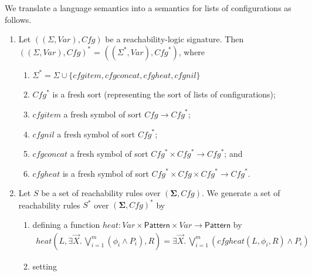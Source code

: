 \documentclass{article}
\newcommand{\Pattern}{\mathsf{Pattern}}
\begin{document}
\begin{definition}\label{def:starextension}
We translate a language semantics into a semantics for lists of configurations as follows.
\begin{enumerate}
    \item Let $((\Sigma, \mathit{Var}), \mathit{Cfg})$ be a reachability-logic signature.
          Then $((\Sigma, \mathit{Var}), \mathit{Cfg})^*$ = $((\Sigma^*, \mathit{Var}), \mathit{Cfg}^*)$,
          where
          \begin{enumerate}
              \item $\Sigma^* = \Sigma \cup \{ \mathit{cfgitem}, \mathit{cfgconcat},
          \mathit{cfgheat},
          \mathit{cfgnil} \}$
              \item $\mathit{Cfg}^*$ is a fresh sort (representing the sort of lists of configurations);
              \item $\mathit{cfgitem}$ a fresh symbol of sort $\mathit{Cfg} \to \mathit{Cfg}^*$;
              \item $\mathit{cfgnil}$ a fresh symbol of sort $\mathit{Cfg}^*$;
              \item $\mathit{cfgconcat}$ a fresh symbol of sort $\mathit{Cfg}^* \times \mathit{Cfg}^* \to \mathit{Cfg}^*$; and
              \item $\mathit{cfgheat}$ is a fresh symbol of sort $\mathit{Cfg}^* \times \mathit{Cfg} \times \mathit{Cfg}^* \to \mathit{Cfg}^*$.
          \end{enumerate}
    \item Let $S$ be a set of reachability rules over $(\mathbf{\Sigma}, \mathit{Cfg})$.
          We generate a set of reachability rules $S^*$ over $(\mathbf{\Sigma}, \mathit{Cfg})^*$
          by
          \begin{enumerate}
              \item defining a function $\mathit{heat} : \mathit{Var} \times \Pattern \times \mathit{Var} \to \Pattern$ by
              \begin{align*}
                  \mathit{heat}(L, \exists \vec{X}.\, \bigvee_{i=1}^{m} (\phi_i \land P_i), R)
                  = \exists \vec{X}.\, \bigvee_{i=1}^{m} ( \mathit{cfgheat(L, \phi_i, R)} \land P_i)
              \end{align*}
              \item setting
              \begin{align*}

\end{align*}
\end{enumerate}
\end{enumerate}
\end{definition}
\end{document}
